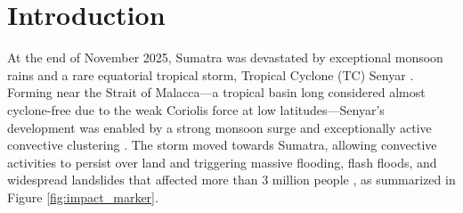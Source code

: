 \chapter{Introduction}

At the end of November 2025, Sumatra was devastated by exceptional monsoon rains and a rare equatorial tropical storm, Tropical Cyclone (TC) Senyar \citep{climameter,egusphere-2026-694}. Forming near the Strait of Malacca—a tropical basin long considered almost cyclone-free due to the weak Coriolis force at low latitudes—Senyar’s development was enabled by a strong monsoon surge and exceptionally active convective clustering \citep{yulihastin2026origins}. The storm moved towards Sumatra, allowing convective activities to persist over land and triggering massive flooding, flash floods, and widespread landslides that affected more than 3 million people \citep{wu2026analysis, wwa, climameter}, as summarized in Figure \ref{fig:impact_marker}.

